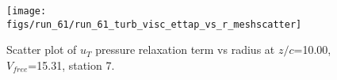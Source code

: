 \begin{figure}[H]
\centering
\texttt{[image: figs/run\_61/run\_61\_turb\_visc\_ettap\_vs\_r\_meshscatter]}
\caption{Scatter plot of $
u_T$ pressure relaxation term vs radius at $z/c$=10.00, $V_{free}$=15.31, station 7.}
\end{figure}


